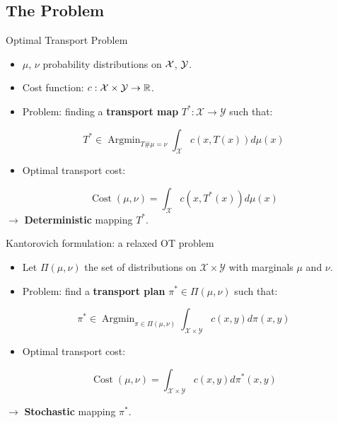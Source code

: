\documentclass[aspectratio=169]{beamer}
\newcommand{\R}{\mathbb{R}}
\DeclareMathOperator*{\Argmin}{\text{Argmin}}
\DeclareMathOperator*{\Cost}{\text{Cost}}
\begin{document}
\subsection{The Problem}
\begin{frame}{Optimal Transport Problem}
    \begin{itemize}
        \item $\mu$, $\nu$ probability distributions on ${\cal X}$, ${\cal Y}$.
        \item Cost function: $c:{\cal X}\times\mathcal{\cal Y}\to\R$.
        \item Problem: finding a \textbf{transport map} $T^*:\mathcal{X}\to \mathcal{Y}$ such that:
    \end{itemize}

    \begin{equation}
        T^* \in \Argmin_{T\#\mu=\nu} \int_{\mathcal{X}} c(x,T(x))d\mu(x)
    \end{equation}

    \begin{itemize}
        \item Optimal transport cost:
    \end{itemize}
    \begin{equation}
        \Cost(\mu,\nu) = \int_{\mathcal{X}} c(x,T^*(x))d\mu(x)
    \end{equation}
    $\rightarrow$ \textbf{Deterministic} mapping $T^*$.

\end{frame}

\begin{frame}{Kantorovich formulation: a relaxed OT problem}
    \begin{itemize}
        \item Let $\Pi(\mu,\nu)$ the set of distributions on $\mathcal{X}\times\mathcal{Y}$ with marginals $\mu$ and $\nu$.
        \item Problem: find a \textbf{transport plan} $\pi^*\in \Pi(\mu,\nu)$ such that:
    \end{itemize}
    \begin{equation}
        \pi^* \in \Argmin_{\pi\in\Pi(\mu,\nu)} \int_{\mathcal{X}\times\mathcal{Y}} c(x,y)d\pi(x,y)
    \end{equation}
    \begin{itemize}
        \item Optimal transport cost:
    \end{itemize}
    \begin{equation}
        \Cost(\mu,\nu) = \int_{\mathcal{X}\times\mathcal{Y}} c(x,y)d\pi^*(x,y)
    \end{equation}

    $\rightarrow$ \textbf{Stochastic} mapping $\pi^*$.
\end{frame}
\end{document}
